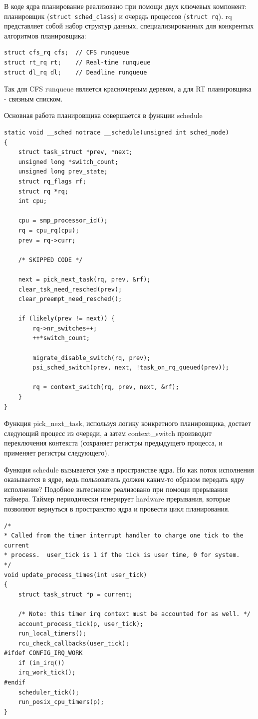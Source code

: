 \documentclass{article}
\begin{document}
\bigbreak
В коде ядра планирование реализовано при помощи двух ключевых компонент: планировщик (\lstinline{struct sched_class}) и очередь процессов (\lstinline{struct rq}). rq представляет собой набор структур данных, специализированных для конкрентых алгоритмов планировщика:
\begin{lstlisting}
struct cfs_rq cfs;  // CFS runqueue
struct rt_rq rt;    // Real-time runqueue
struct dl_rq dl;    // Deadline runqueue
\end{lstlisting}
Так для CFS runqueue является красночерным деревом, а для RT планировщика - связным списком.

\bigbreak
Основная работа планировщика совершается в функции schedule
\begin{lstlisting}
static void __sched notrace __schedule(unsigned int sched_mode)
{
	struct task_struct *prev, *next;
	unsigned long *switch_count;
	unsigned long prev_state;
	struct rq_flags rf;
	struct rq *rq;
	int cpu;

	cpu = smp_processor_id();
	rq = cpu_rq(cpu);
	prev = rq->curr;

	/* SKIPPED CODE */
	
	next = pick_next_task(rq, prev, &rf);
	clear_tsk_need_resched(prev);
	clear_preempt_need_resched();

	if (likely(prev != next)) {
        rq->nr_switches++;
        ++*switch_count;

        migrate_disable_switch(rq, prev);
        psi_sched_switch(prev, next, !task_on_rq_queued(prev));

        rq = context_switch(rq, prev, next, &rf);
    }
}
\end{lstlisting}

Функция pick\_next\_task, используя логику конкретного планировщика, достает следующий процесс из очереди, а затем context\_switch производит переключения контекста (сохраняет регистры предыдущего процесса, и применяет регистры следующего).

\bigbreak
Функция schedule вызывается уже в пространстве ядра. Но как поток исполнения оказывается в ядре, ведь пользователь должен каким-то образом передать ядру исполнение?
\bigbreak
Подобное вытеснение реализовано при помощи прерывания таймера. Таймер периодически генерирует hardware прерывания, которые позволяют вернуться в пространство ядра и провести цикл планирования.
\begin{lstlisting}
/*
* Called from the timer interrupt handler to charge one tick to the current
* process.  user_tick is 1 if the tick is user time, 0 for system.
*/
void update_process_times(int user_tick)
{
	struct task_struct *p = current;

	/* Note: this timer irq context must be accounted for as well. */
	account_process_tick(p, user_tick);
	run_local_timers();
	rcu_check_callbacks(user_tick);
#ifdef CONFIG_IRQ_WORK
	if (in_irq())
	irq_work_tick();
#endif
	scheduler_tick();
	run_posix_cpu_timers(p);
}
\end{lstlisting}
\end{document}
